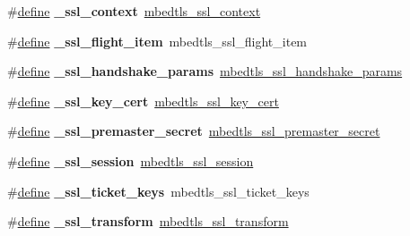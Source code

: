 \begin{DoxyCompactItemize}
\mbox{\label{compat-1_83_8h_acd2ac222d081f1a637cc2b338414b306}} 
\#\hyperlink{structdefine}{define} {\bfseries \+\_\+ssl\+\_\+context}~\hyperlink{structmbedtls__ssl__context}{mbedtls\+\_\+ssl\+\_\+context}
\item 
\mbox{\label{compat-1_83_8h_a64422c387d642c737bfc2fd8fc78d267}} 
\#\hyperlink{structdefine}{define} {\bfseries \+\_\+ssl\+\_\+flight\+\_\+item}~mbedtls\+\_\+ssl\+\_\+flight\+\_\+item
\item 
\mbox{\label{compat-1_83_8h_ab75b105f18bb97a621fde82e7049828d}} 
\#\hyperlink{structdefine}{define} {\bfseries \+\_\+ssl\+\_\+handshake\+\_\+params}~\hyperlink{structmbedtls__ssl__handshake__params}{mbedtls\+\_\+ssl\+\_\+handshake\+\_\+params}
\item 
\mbox{\label{compat-1_83_8h_a7f41b8c50c590480d34cb1e37712c005}} 
\#\hyperlink{structdefine}{define} {\bfseries \+\_\+ssl\+\_\+key\+\_\+cert}~\hyperlink{structmbedtls__ssl__key__cert}{mbedtls\+\_\+ssl\+\_\+key\+\_\+cert}
\item 
\mbox{\label{compat-1_83_8h_ac7cb71d1133a8c69f8e5da331e5f9656}} 
\#\hyperlink{structdefine}{define} {\bfseries \+\_\+ssl\+\_\+premaster\+\_\+secret}~\hyperlink{unionmbedtls__ssl__premaster__secret}{mbedtls\+\_\+ssl\+\_\+premaster\+\_\+secret}
\item 
\mbox{\label{compat-1_83_8h_a0926d71974f38b1de374aad845d7a465}} 
\#\hyperlink{structdefine}{define} {\bfseries \+\_\+ssl\+\_\+session}~\hyperlink{structmbedtls__ssl__session}{mbedtls\+\_\+ssl\+\_\+session}
\item 
\mbox{\label{compat-1_83_8h_acf2e93d2931534f66f9b31f0c5da8f23}} 
\#\hyperlink{structdefine}{define} {\bfseries \+\_\+ssl\+\_\+ticket\+\_\+keys}~mbedtls\+\_\+ssl\+\_\+ticket\+\_\+keys
\item 
\mbox{\label{compat-1_83_8h_ab25accc41b13e24df3785da821d25bf1}} 
\#\hyperlink{structdefine}{define} {\bfseries \+\_\+ssl\+\_\+transform}~\hyperlink{structmbedtls__ssl__transform}{mbedtls\+\_\+ssl\+\_\+transform}
\item 
\mbox{\label{compat-1_83_8h_a1334a6cf76c3123edfbfd1ee7a37b2ee}} 

\end{DoxyCompactItemize}
